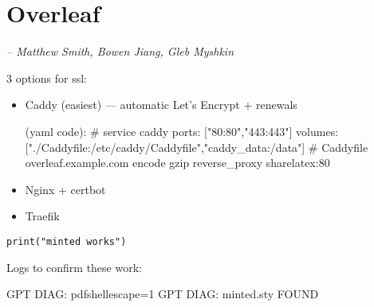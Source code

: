 \chapter{Overleaf}
\small{\textit{-- Matthew Smith, Bowen Jiang, Gleb Myshkin}}
\label{Chapter::Overleaf}


3 options for ssl:

\begin{itemize}
        \item Caddy (easiest) — automatic Let’s Encrypt + renewals

        (yaml code): # service caddy
        ports: ["80:80","443:443"]
        volumes: ["./Caddyfile:/etc/caddy/Caddyfile","caddy_data:/data"]
        # Caddyfile
        overleaf.example.com {
          encode gzip
          reverse_proxy sharelatex:80
        }
        \item Nginx + certbot
        \item Traefik
    \end{itemize}

\begin{verbatim}
print("minted works")
\end{verbatim}


Logs to confirm these work:

GPT DIAG: pdfshellescape=1
GPT DIAG: minted.sty FOUND